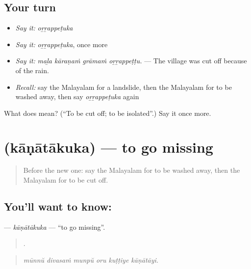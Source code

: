\subsection*{Your turn}
\begin{itemize}
\raggedright
  \item \emph{Say it:} \emph{oṟṟappeṭuka}
  \item \emph{Say it:} \emph{oṟṟappeṭuka}, once more
  \item \emph{Say it:} \emph{maḻa kāraṇaṁ grāmaṁ oṟṟappeṭṭu.} — The village was cut off because of the rain.
  \item \emph{Recall:} say the Malayalam for a landslide, then the Malayalam for to be washed away, then say \emph{oṟṟappeṭuka} again
\end{itemize}

\begin{tcolorbox}[breakable,colback=teal!4,colframe=teal!35!black,title={Before you move on}]
What does  mean? (\textquotedblleft{}To be cut off; to be isolated\textquotedblright{}.) Say it once more.
\end{tcolorbox}
\section[\texorpdfstring{\ml{കാണാതാകുക} (kāṇātākuka)}{കാണാതാകുക (kāṇātākuka)}]{ (kāṇātākuka) — to go missing}

\label{lesson:ML-C377-kanatakuka}



\begin{quote}
Before the new one: say the Malayalam for to be washed away, then the Malayalam for to be cut off.
\end{quote}

\subsection*{You'll want to know: }
\textbf{} — \emph{kāṇātākuka} — \textquotedblleft{}to go missing\textquotedblright{}.

\begin{quote}
     .
\end{quote}

\begin{quote}
\emph{mūnnŭ divasaṁ munpŭ oru kuṭṭiye kāṇātāyi.}
\end{quote}

